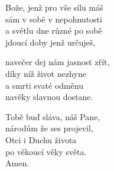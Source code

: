 \begin{translatioMulticol}{3}
Bože, jenž pro vše sílu máš\\
sám v sobě v nepohnutosti\\
a světlu dne různé po sobě\\
jdoucí doby jenž určuješ,\columnbreak

navečer dej nám jasnost zřít,\\
díky níž život nezhyne\\
a smrti svaté odměnu\\
navěky slavnou dostane.\columnbreak

Tobě buď sláva, náš Pane,\\
národům že ses projevil,\\
Otci i Duchu života\\
po věkoucí věky světa.\\
Amen.
\end{translatioMulticol}

